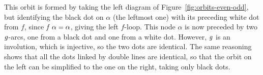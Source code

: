 \documentclass[sigplan,screen]{acmart}
\newcommand{\m}[1]{\todo[fancyline,color=blue!40,size=\scriptsize]{\textsf{JC: #1}}} %
\renewcommand{\HOLinline}[1]{\ensuremath{#1}} %
\renewcommand{\HOLSymConst}[1]{{\fontsize{9pt}{1em}\selectfont\textsf{\upshape #1}}}
\begin{document}

This orbit is formed by taking the left diagram of Figure~\ref{fig:orbits-even-odd},
but identifying the black dot on $\alpha$ (the leftmost one) with its preceding white dot from $f$, since \HOLinline{\HOLFreeVar{f}\;\HOLFreeVar{\alpha}\;\HOLSymConst{=}\;\HOLFreeVar{\alpha}}, giving the left $f$-loop.
This node $\alpha$ is now preceded by two \HOLinline{\HOLFreeVar{g}}-arcs, one from a black dot and one from a white dot. However, \HOLinline{\HOLFreeVar{g}} is an involution, which is injective, so the two dots are identical. The same reasoning shows that all the dots linked by double lines are identical, so that the orbit on the left can be simplified to the one on the right, taking only black dots.
\end{document}
